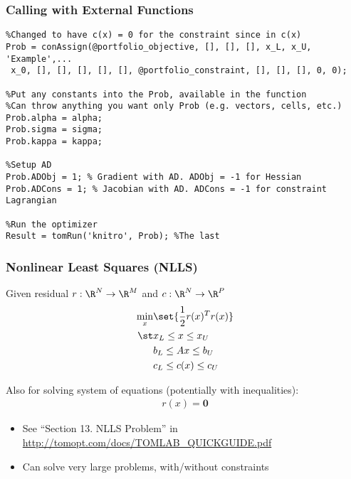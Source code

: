 \documentclass[nofootline]{etk-presentation}
\begin{document}
\begin{frame}[fragile]	\frametitle{Calling with External Functions}
\begin{verbatim}
%Changed to have c(x) = 0 for the constraint since in c(x)
Prob = conAssign(@portfolio_objective, [], [], [], x_L, x_U, 'Example',...
 x_0, [], [], [], [], [], @portfolio_constraint, [], [], [], 0, 0);

%Put any constants into the Prob, available in the function
%Can throw anything you want only Prob (e.g. vectors, cells, etc.)
Prob.alpha = alpha;
Prob.sigma = sigma;
Prob.kappa = kappa;

%Setup AD
Prob.ADObj = 1; % Gradient with AD. ADObj = -1 for Hessian
Prob.ADCons = 1; % Jacobian with AD. ADCons = -1 for constraint Lagrangian 

%Run the optimizer
Result = tomRun('knitro', Prob); %The last 	
\end{verbatim}	
\end{frame}	
	
\begin{frame}\frametitle{}
	\bigskip
	\bigskip
	\bigskip	
	\begin{center}
		{\huge {}}
	\end{center}
\end{frame}

\begin{frame}[fragile]	\frametitle{Nonlinear Least Squares (NLLS)}
	Given residual $r : \R^N \to \R^M$ and $c : \R^N \to \R^P$
	\begin{align*}
		\min_x &\set{\frac{1}{2}r(x)^T r(x)}\\
		\st & x_L \leq x \leq x_U\\
		& b_L \leq A x \leq b_U\\
		& c_L \leq c(x) \leq c_U
	\end{align*}
	
	Also for solving system of equations (potentially with inequalities):
	\begin{align*}
		r(x) = \mathbf{0}
	\end{align*}
	\begin{itemize}
		\item See ``Section 13. NLLS Problem'' in \url{http://tomopt.com/docs/TOMLAB_QUICKGUIDE.pdf}
		\item Can solve very large problems, with/without constraints
	\end{itemize}
\end{frame}
\end{document}
